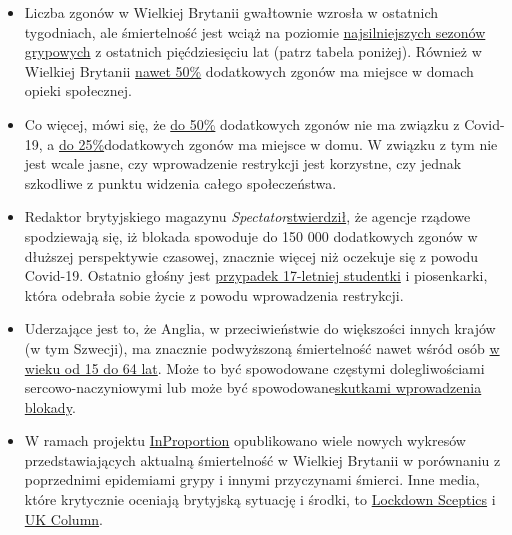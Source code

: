\begin{itemize}
\tightlist
\item
  Liczba zgonów w Wielkiej Brytanii gwałtownie wzrosła w ostatnich
  tygodniach, ale śmiertelność jest wciąż na poziomie
  \href{http://inproportion2.talkigy.com/}{najsilniejszych sezonów
  grypowych} z ostatnich pięćdziesięciu lat (patrz tabela poniżej).
  Również w Wielkiej Brytanii
  \href{https://ltccovid.org/2020/04/12/mortality-associated-with-covid-19-outbreaks-in-care-homes-early-international-evidence/}{nawet
  50\%} dodatkowych zgonów ma miejsce w domach opieki społecznej.
\item
  Co więcej, mówi się, że
  \href{https://www.thetimes.co.uk/edition/news/coronavirus-record-weekly-death-toll-as-fearful-patients-avoid-hospitals-bm73s2tw3}{do
  50\%} dodatkowych zgonów nie ma związku z Covid-19, a
  \href{https://www.ft.com/content/67e6a4ee-3d05-43bc-ba03-e239799fa6ab}{do
  25\%}dodatkowych zgonów ma miejsce w domu. W związku z tym nie jest
  wcale jasne, czy wprowadzenie restrykcji jest korzystne, czy jednak
  szkodliwe z punktu widzenia całego społeczeństwa.
\item
  Redaktor brytyjskiego magazynu
  \emph{Spectator}\href{https://www.telegraph.co.uk/politics/2020/04/09/boris-worried-lockdown-has-gone-far-can-end/}{stwierdził},
  że agencje rządowe spodziewają się, iż blokada spowoduje do 150 000
  dodatkowych zgonów w dłuższej perspektywie czasowej, znacznie więcej
  niż oczekuje się z powodu Covid-19. Ostatnio głośny jest
  \href{https://sports.yahoo.com/coronavirus-bethany-palmer-teenager-death-suicide-152707750.html}{przypadek
  17-letniej studentki} i piosenkarki, która odebrała sobie życie z
  powodu wprowadzenia restrykcji.
\item
  Uderzające jest to, że Anglia, w przeciwieństwie do większości innych
  krajów (w tym Szwecji), ma znacznie podwyższoną śmiertelność nawet
  wśród osób \href{https://www.euromomo.eu/}{w wieku od 15 do 64 lat}.
  Może to być spowodowane częstymi dolegliwościami sercowo-naczyniowymi
  lub może być
  spowodowane\href{https://www.telegraph.co.uk/global-health/science-and-disease/two-new-waves-deaths-break-nhs-new-analysis-warns/}{skutkami
  wprowadzenia blokady}.
\item
  W ramach projektu
  \href{http://inproportion2.talkigy.com/}{InProportion} opublikowano
  wiele nowych wykresów przedstawiających aktualną śmiertelność w
  Wielkiej Brytanii w porównaniu z poprzednimi epidemiami grypy i innymi
  przyczynami śmierci. Inne media, które krytycznie oceniają brytyjską
  sytuację i środki, to \href{https://lockdownsceptics.org/}{Lockdown
  Sceptics} i \href{https://www.ukcolumn.org/}{UK Column}.
\end{itemize}

